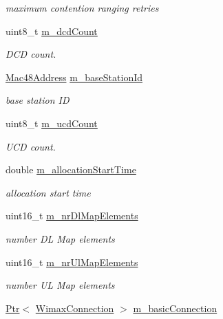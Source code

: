 \begin{DoxyCompactItemize}
\begin{DoxyCompactList}\small\item\em maximum contention ranging retries \end{DoxyCompactList}\item 
uint8\+\_\+t \hyperlink{classns3_1_1SubscriberStationNetDevice_a6ccc4320d632d7e792f1e52f82f4f932}{m\+\_\+dcd\+Count}
\begin{DoxyCompactList}\small\item\em D\+CD count. \end{DoxyCompactList}\item 
\hyperlink{classns3_1_1Mac48Address}{Mac48\+Address} \hyperlink{classns3_1_1SubscriberStationNetDevice_a9745729222112443a4b527f681537c48}{m\+\_\+base\+Station\+Id}
\begin{DoxyCompactList}\small\item\em base station ID \end{DoxyCompactList}\item 
uint8\+\_\+t \hyperlink{classns3_1_1SubscriberStationNetDevice_a0adf7470dd476619c9c5298bb52e9a32}{m\+\_\+ucd\+Count}
\begin{DoxyCompactList}\small\item\em U\+CD count. \end{DoxyCompactList}\item 
double \hyperlink{classns3_1_1SubscriberStationNetDevice_a2cb4adc0ed8b698b828e86b8575fb9ee}{m\+\_\+allocation\+Start\+Time}
\begin{DoxyCompactList}\small\item\em allocation start time \end{DoxyCompactList}\item 
uint16\+\_\+t \hyperlink{classns3_1_1SubscriberStationNetDevice_ae354b1eac308bd91fc0623ae62e79b5e}{m\+\_\+nr\+Dl\+Map\+Elements}
\begin{DoxyCompactList}\small\item\em number DL Map elements \end{DoxyCompactList}\item 
uint16\+\_\+t \hyperlink{classns3_1_1SubscriberStationNetDevice_afa02715a896d7372bfb06399ba2087a3}{m\+\_\+nr\+Ul\+Map\+Elements}
\begin{DoxyCompactList}\small\item\em number UL Map elements \end{DoxyCompactList}\item 
\hyperlink{classns3_1_1Ptr}{Ptr}$<$ \hyperlink{classns3_1_1WimaxConnection}{Wimax\+Connection} $>$ \hyperlink{classns3_1_1SubscriberStationNetDevice_ae166a9acaa0e8d720a106491ba9ea2fc}{m\+\_\+basic\+Connection}

\end{DoxyCompactItemize}
